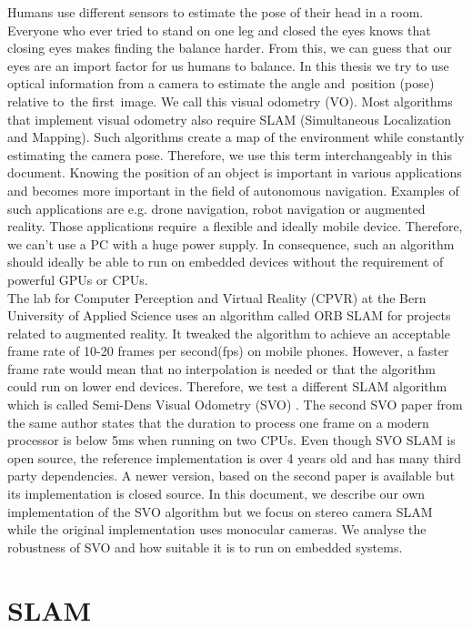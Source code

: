\documentclass[11pt,a4paper,titlepage,oneside]{report}
\begin{document}
Humans use different sensors to estimate the pose of their head in a room. Everyone who ever tried to stand on one leg and closed the eyes knows that closing eyes makes finding the balance harder. From this, we can guess that our eyes are an import factor for us humans to balance. In this thesis we try to use optical information from a camera to estimate the angle and position (pose) relative to the first image. We call this visual odometry (VO). Most algorithms that implement visual odometry also require SLAM (Simultaneous Localization and Mapping). Such algorithms create a map of the environment while constantly estimating the camera pose. Therefore, we use this term interchangeably in this document. Knowing the position of an object is important in various applications and becomes more important in the field of autonomous navigation. Examples of such applications are e.g. drone navigation, robot navigation or augmented reality. Those applications require a flexible and ideally mobile device. Therefore, we can’t use a PC with a huge power supply. In consequence, such an algorithm should ideally be able to run on embedded devices without the requirement of powerful GPUs or CPUs.\\
The lab for Computer Perception and Virtual Reality (CPVR) at the Bern University of Applied Science uses an algorithm called ORB SLAM \cite{orbslam} for projects related to augmented reality. It tweaked the algorithm to achieve an acceptable frame rate of 10-20 frames per second(fps) on mobile phones. However, a faster frame rate would mean that no interpolation is needed or that the algorithm could run on lower end devices. Therefore, we test a different SLAM algorithm which is called Semi-Dens Visual Odometry (SVO) \cite{svo}. The second SVO paper \cite{svo2} from the same author states that the duration to process one frame on a modern processor is below 5ms when running on two CPUs. Even though SVO SLAM is open source, the reference implementation is over 4 years old and has many third party dependencies. A newer version, based on the second paper is available but its implementation is closed source. In this document, we describe our own implementation of the SVO algorithm but we focus on stereo camera SLAM while the original implementation uses monocular cameras. We analyse the robustness of SVO and how suitable it is to run on embedded systems.

\section{SLAM}
\end{document}

